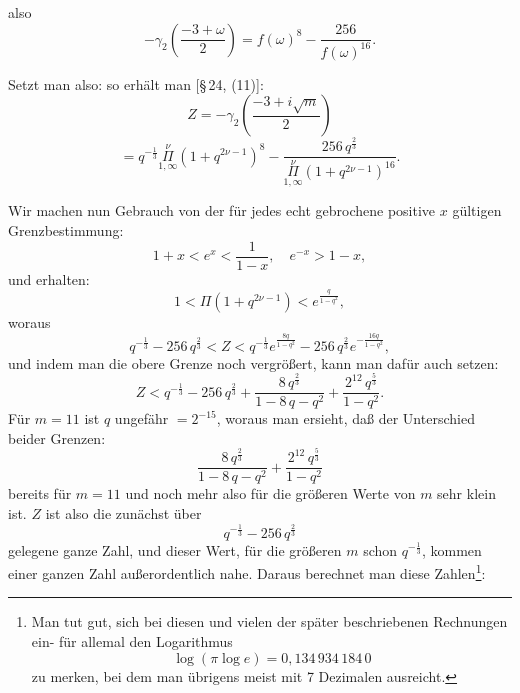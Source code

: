 also
\[
-\gamma_2\left(\frac{-3+\omega}{2}\right) = f(\omega)^8 - \frac{256}{f(\omega)^{16}}.
\]

Setzt man also:
so erh\"alt man [\S\,24, (11)]:
\[
Z = -\gamma_2\left(\frac{-3+i\sqrt{m}}{2}\right)
\]
\[
= q^{-\frac{1}{3}} \overset{\nu}{\underset{1,\infty}{\Pi}} (1+q^{2\nu-1})^8 - \frac{256\,q^{\frac{2}{3}}}{\overset{\nu}{\underset{1,\infty}{\Pi}} (1+q^{2\nu-1})^{16}}.
\]

Wir machen nun Gebrauch von der f\"ur jedes echt gebrochene positive $x$ g\"ultigen Grenzbestimmung:
\[
1+x < e^x < \frac{1}{1-x}, \quad e^{-x} > 1-x,
\]
und erhalten:
\[
1 < \Pi(1+q^{2\nu-1}) < e^{\frac{q}{1-q^2}},
\]
woraus
\[
q^{-\frac{1}{3}} - 256\,q^{\frac{2}{3}} < Z < q^{-\frac{1}{3}} e^{\frac{8q}{1-q^2}} - 256\,q^{\frac{2}{3}} e^{-\frac{16q}{1-q^2}},
\]
und indem man die obere Grenze noch vergr\"o{\ss}ert, kann man daf\"ur auch setzen:
\[
Z < q^{-\frac{1}{3}} - 256\,q^{\frac{2}{3}} + \frac{8\,q^{\frac{2}{3}}}{1-8\,q-q^2} + \frac{2^{12}\,q^{\frac{5}{3}}}{1-q^2}.
\]
F\"ur $m=11$ ist $q$ ungef\"ahr $=2^{-15}$, woraus man ersieht, da{\ss} der Unterschied beider Grenzen:
\[
\frac{8\,q^{\frac{2}{3}}}{1-8\,q-q^2} + \frac{2^{12}\,q^{\frac{5}{3}}}{1-q^2}
\]
bereits f\"ur $m=11$ und noch mehr also f\"ur die gr\"o{\ss}eren Werte von $m$ sehr klein ist. $Z$ ist also die zun\"achst \"uber
\[
q^{-\frac{1}{3}} - 256\,q^{\frac{2}{3}}
\]
gelegene ganze Zahl, und dieser Wert, f\"ur die gr\"o{\ss}eren $m$ schon $q^{-\frac{1}{3}}$, kommen einer ganzen Zahl au{\ss}erordentlich nahe. %
Daraus berechnet man diese Zahlen\footnote{Man tut gut, sich bei diesen und vielen der sp\"ater beschriebenen Rechnungen ein- f\"ur allemal den  Logarithmus
\[
\log(\pi \log e) = 0{,}134\,934\,184\,0
\]
zu merken, bei dem man \"ubrigens meist mit 7 Dezimalen ausreicht.}:
